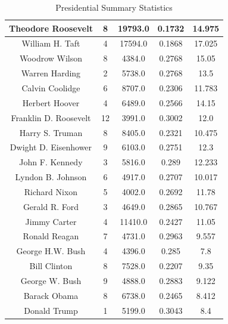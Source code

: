 \begin{singlespace}
\begin{table}[tp]
\begin{center}
\begin{tabular}{||c | c c c c||}
 \hline
  Theodore Roosevelt & 8 & 19793.0 & 0.1732 & 14.975 \\
 \hline
  William H. Taft & 4 & 17594.0 & 0.1868 & 17.025 \\
 \hline
  Woodrow Wilson & 8 & 4384.0 & 0.2768 & 15.05 \\
 \hline
  Warren Harding & 2 & 5738.0 & 0.2768 & 13.5 \\
 \hline
  Calvin Coolidge & 6 & 8707.0 & 0.2306 & 11.783 \\
 \hline
  Herbert Hoover & 4 & 6489.0 & 0.2566 & 14.15 \\
 \hline
  Franklin D. Roosevelt & 12 & 3991.0 & 0.3002 & 12.0 \\
 \hline
  Harry S. Truman & 8 & 8405.0 & 0.2321 & 10.475 \\
 \hline
  Dwight D. Eisenhower & 9 & 6103.0 & 0.2751 & 12.3 \\
 \hline
  John F. Kennedy & 3 & 5816.0 & 0.289 & 12.233 \\
 \hline
  Lyndon B. Johnson & 6 & 4917.0 & 0.2707 & 10.017 \\
 \hline
  Richard Nixon & 5 & 4002.0 & 0.2692 & 11.78 \\
 \hline
  Gerald R. Ford & 3 & 4649.0 & 0.2865 & 10.767 \\
 \hline
  Jimmy Carter & 4 & 11410.0 & 0.2427 & 11.05 \\
 \hline
  Ronald Reagan & 7 & 4731.0 & 0.2963 & 9.557 \\
 \hline
  George H.W. Bush & 4 & 4396.0 & 0.285 & 7.8 \\
 \hline
  Bill Clinton & 8 & 7528.0 & 0.2207 & 9.35 \\
 \hline
  George W. Bush & 9 & 4888.0 & 0.2883 & 9.122 \\
 \hline
 Barack Obama & 8 & 6738.0 & 0.2465 & 8.412 \\
 \hline
  Donald Trump & 1 & 5199.0 & 0.3043 & 8.4 \\
 \hline
\end{tabular}
\end{center}
\caption{Presidential Summary Statistics}
\label{stat:one}
\end{table}
\end{singlespace}

